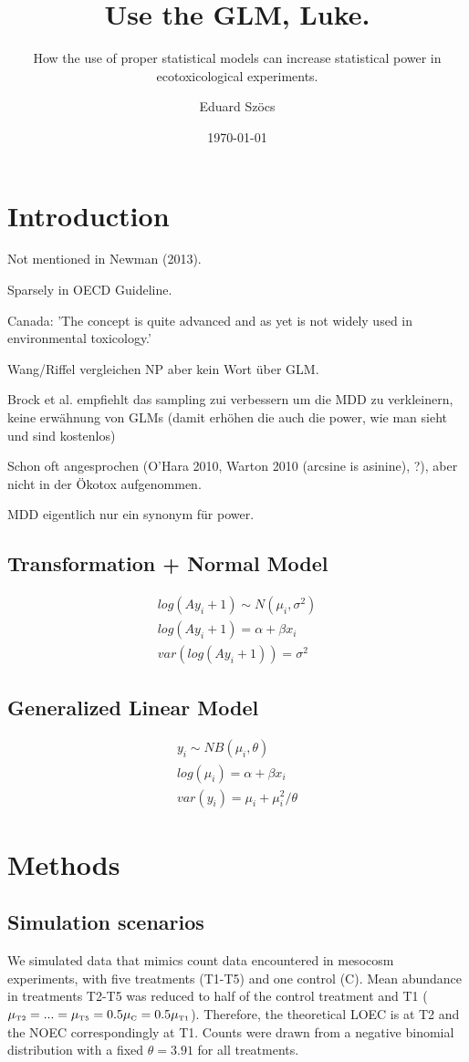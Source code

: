 \documentclass{scrartcl}\usepackage[]{graphicx}\usepackage[]{color}
\title{Use the GLM, Luke.}
\subtitle{How the use of proper statistical models can increase statistical power in ecotoxicological experiments.}
\author{Eduard Szöcs}
\date{\today}
\begin{document}
\maketitle

\section{Introduction}
Not mentioned in Newman (2013). 

Sparsely in OECD Guideline. 

Canada: 'The concept is quite advanced and as yet is not widely used in environmental toxicology.'

Wang/Riffel vergleichen NP aber kein Wort über GLM.

Brock et al. empfiehlt das sampling zui verbessern um die MDD zu verkleinern, keine erwähnung von GLMs (damit erhöhen die auch die power, wie man sieht und sind kostenlos)


Schon oft angesprochen (O'Hara 2010, Warton 2010 (arcsine is asinine), ?), aber nicht in der Ökotox aufgenommen.

MDD eigentlich nur ein synonym für power.

\subsection{Transformation + Normal Model}
\begin{align}
  log(Ay_i + 1) \sim N(\mu_i, \sigma^2) \nonumber \\
  log(Ay_i + 1) = \alpha + \beta x_i \nonumber \\
  var(log(Ay_i + 1)) = \sigma^2 \label{eqn:1}
\end{align}


\subsection{Generalized Linear Model}
\begin{align}
  y_i \sim NB(\mu_i, \theta)  \nonumber \\
  log(\mu_i) = \alpha + \beta x_i   \nonumber \\
  var(y_i) = \mu_i + \mu_i^2 / \theta  \label{eqn:2}
\end{align}


\section{Methods}
\subsection{Simulation scenarios}
We simulated data that mimics count data encountered in mesocosm experiments, with five treatments (T1-T5) and one control (C). 
Mean abundance in treatments T2-T5 was reduced to half of the control treatment and T1 ($\mu_\text{\tiny T2} = ... = \mu_\text{\tiny T5} = 0.5 \mu_\text{\tiny C} = 0.5 \mu_\text{\tiny T1} $). Therefore, the theoretical LOEC is at T2 and the NOEC correspondingly at T1.
Counts were drawn from a negative binomial distribution with a fixed $\theta = 3.91$ for all treatments.
\end{document}
